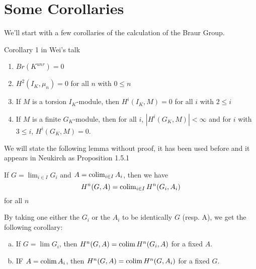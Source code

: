 
\title{}
\author{Jack J Garzella}




\section{Some Corollaries}


We'll start with a few corollaries of the calculation of the Braur Group.

Corollary 1 in Wei's talk


\begin{corollary}
	\begin{enumerate}[(1)]
		\item \(Br(K^{unr}) = 0\)
		\item \(H^{2}(I_{K},\mu_{n}) = 0\) for all \(n\) with \(0 \leq n\)
		\item If \(M\) is a torsion \(I_{K}\)-module, then
			\(H^{i}(I_{K},M) = 0\) for all \(i\) with \(2 \leq i\)
		\item If \(M\) is a finite \(G_{K}\)-module, then
			for all \(i\), \(\left| H^{i}(G_{K},M) \right| < \infty\) 
			and for \(i\) with \(3 \leq i\), 
			\(H^{i}(G_{K},M) = 0\).
	\end{enumerate}
\end{corollary}

We will state the following lemma without proof, it has been used before
and it appears in Neukirch as Proposition 1.5.1

\begin{lem}
	If \(G = \lim_{i \in I} G_{i}\) and \(A = \operatorname{colim}_{i \in I} A_{i}\),
	then we have 
	\[
		H^{n}(G,A) = \operatorname{colim}_{i \in I} H^{n}(G_{i},A_{i})
	\] 
	for all \(n\)
\end{lem}

By taking one either the \(G_{i}\) or the \(A_{i}\) to be identically
\(G\) (resp. A), we get the following corollary:

\begin{corollary}\label{cor:lim:cohom}
	\begin{enumerate}[(a)]
		\item If \(G = \lim G_{i}\), then 
			\(H^{n}(G,A) = \operatorname{colim} H^{n}(G_{i},A)\) for a fixed \(A\).
		\item IF \(A = \operatorname{colim} A_{i}\), then 
			\(H^{n}(G,A) = \operatorname{colim} H^{n}(G,A_{i})\) for a fixed \(G\).
	\end{enumerate}
\end{corollary}

